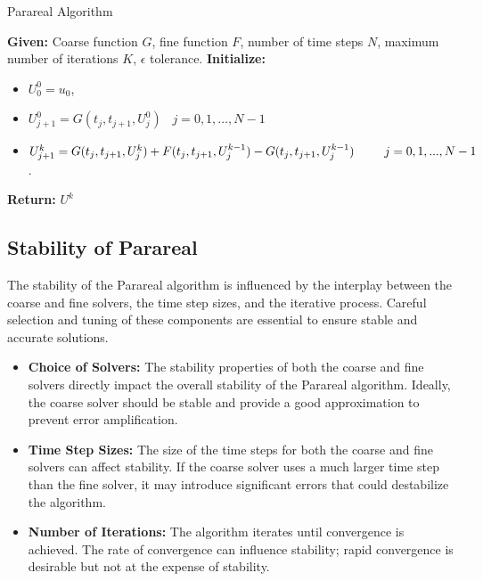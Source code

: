 \documentclass[a4paper,12pt,french]{article}
\begin{document}
\begin{algorithm}
\caption{Parareal Algorithm}
\begin{algorithmic}[1]
\STATE \textbf{Given:} Coarse function $G$, fine function $F$, number of time steps $N$, maximum number of iterations $K$, $\epsilon$ tolerance.
\STATE \textbf{Initialize:} \begin{itemize}
    \item  $U_0^0 = u_0$,
    \item $ U_{j+1}^0 = G(t_j,t_{j+1}, U_j^0) \;\;\;j = 0,1, \ldots, N-1$
\end{itemize}
    \begin{itemize}
        \item  $ U_{j+1}^k = G(t_j,t_{j+1},U_j^k) + F(t_j,t_{j+1},U_j^{k-1}) -G(t_j,t_{j+1},U_j^{k-1})\;\;\;\;\;\;\;\;\;\;\newline j = 0,1, ... ,N-1$.
    \end{itemize}
\ENDWHILE
\STATE \textbf{Return:} $U^k$
\end{algorithmic}
\end{algorithm}

\subsection{Stability of Parareal}
The stability of the Parareal algorithm is influenced by the interplay between the coarse and fine solvers, the time step sizes, and the iterative process. Careful selection and tuning of these components are essential to ensure stable and accurate solutions.
\begin{itemize}
    \item \textbf{Choice of Solvers:} The stability properties of both the coarse and fine solvers directly impact the overall stability of the Parareal algorithm. Ideally, the coarse solver should be stable and provide a good approximation to prevent error amplification.
    \item \textbf{Time Step Sizes:} The size of the time steps for both the coarse and fine solvers can affect stability. If the coarse solver uses a much larger time step than the fine solver, it may introduce significant errors that could destabilize the algorithm.
    \item \textbf{Number of Iterations:} The algorithm iterates until convergence is achieved. The rate of convergence can influence stability; rapid convergence is desirable but not at the expense of stability. 
\end{itemize}
\newpage
\end{document}
